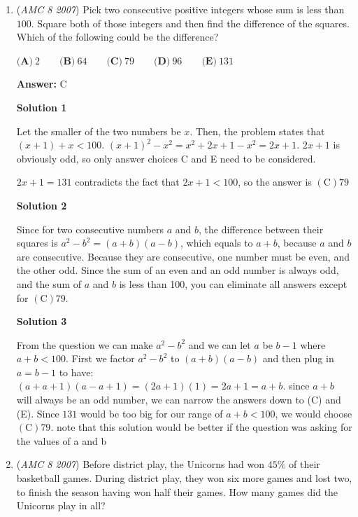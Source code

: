 \begin{enumerate}
 


	\item (\textit{AMC 8 2007}) Pick two consecutive positive integers whose sum is less than $100$. Square both
of those integers and then find the difference of the squares. Which of the
following could be the difference?


 $\textbf{(A)}\ 2 \qquad \textbf{(B)}\ 64 \qquad \textbf{(C)}\ 79 \qquad \textbf{(D)}\ 96 \qquad \textbf{(E)}\ 131$

 \textbf{Answer: }C



\textbf{Solution 1}

Let the smaller of the two numbers be $x$. Then, the problem states that $(x+1)+x<100$. $(x+1)^2-x^2=x^2+2x+1-x^2=2x+1$. $2x+1$ is obviously odd, so only answer choices C and E need to be considered.

 $2x+1=131$ contradicts the fact that $2x+1<100$, so the answer is $\boxed{\mathrm{(C)} 79}$




\textbf{Solution 2}

Since for two consecutive numbers $a$ and $b$, the difference between their squares is $a^2-b^2=(a+b)(a-b)$, which equals to $a+b$, because $a$ and $b$ are consecutive. Because they are consecutive, one number must be even, and the other odd. Since the sum of an even and an odd number is always odd, and the sum of $a$ and $b$ is less than 100, you can eliminate all answers except for $\boxed{\mathrm{(C)} 79}$.

 



\textbf{Solution 3}

From the question we can make $a^2-b^2$ and we can let $a$ be $b-1$ where $a+b<100$. First we factor $a^2-b^2$ to $(a+b)(a-b)$ and then plug in $a=b-1$ to have: $(a+a+1)(a-a+1)=(2a+1)(1)=2a+1=a+b$. since $a+b$ will always be an odd number, we can narrow the answers down to (C) and (E). Since $131$ would be too big for our range of $a+b<100$, we would choose $\boxed{\mathrm{(C)} 79}$. note that this solution would be better if the question was asking for the values of a and b

 


	\item (\textit{AMC 8 2007}) Before district play, the Unicorns had won $45\%$ of their
basketball games. During district play, they won six more
games and lost two, to finish the season having won half
their games. How many games did the Unicorns play in
all?



\end{enumerate}
